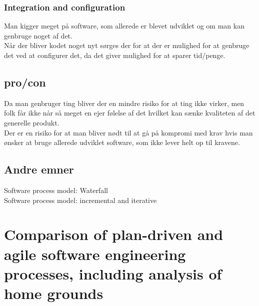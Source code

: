 \documentclass[11pt,a4paper]{article}
\begin{document}
\subsubsection*{Integration and configuration}
Man kigger meget på software, som allerede er blevet udviklet og om man kan genbruge noget af det.\\
Når der bliver kodet noget nyt sørges der for at der er mulighed for at genbruge det ved at configurer det, da det giver mulighed for at sparer tid/penge.
\subsection{pro/con}
Da man genbruger ting bliver der en mindre risiko for at ting ikke virker, men folk får ikke når så meget en ejer følelse af det hvilket kan sænke kvaliteten af det generelle produkt.\\
Der er en risiko for at man bliver nødt til at gå på kompromi med krav hvis man ønsker at bruge allerede udviklet software, som ikke lever helt op til kravene.
\subsection{Andre emner}
Software process model: Waterfall\\
Software process model: incremental and iterative
\newpage
\section{Comparison of plan-driven and agile software engineering processes, including analysis of home grounds}
\end{document}
